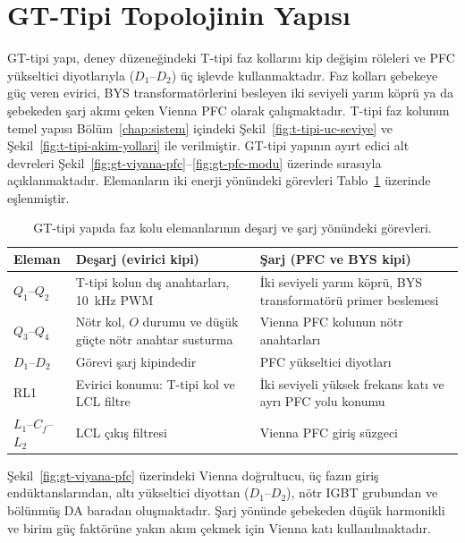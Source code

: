 \section{GT-Tipi Topolojinin Yapısı}
\label{sec:gt-yapi}

GT-tipi yapı, deney düzeneğindeki T-tipi faz kollarını kip değişim röleleri ve PFC yükseltici diyotlarıyla ($D_1$--$D_2$) üç işlevde kullanmaktadır. Faz kolları şebekeye güç veren evirici, BYS transformatörlerini besleyen iki seviyeli yarım köprü ya da şebekeden şarj akımı çeken Vienna PFC olarak çalışmaktadır. T-tipi faz kolunun temel yapısı Bölüm~\ref{chap:sistem} içindeki Şekil~\ref{fig:t-tipi-uc-seviye} ve Şekil~\ref{fig:t-tipi-akim-yollari} ile verilmiştir. GT-tipi yapının ayırt edici alt devreleri Şekil~\ref{fig:gt-viyana-pfc}--\ref{fig:gt-pfc-modu} üzerinde sırasıyla açıklanmaktadır. Elemanların iki enerji yönündeki görevleri Tablo~\ref{tab:gt-eleman-gorevleri} üzerinde eşlenmiştir.

\begin{table}[H]
  \centering
  \caption{GT-tipi yapıda faz kolu elemanlarının deşarj ve şarj yönündeki görevleri.}
  \label{tab:gt-eleman-gorevleri}
  \small
  \begin{tabularx}{\textwidth}{@{}>{\raggedright\arraybackslash}p{}>{\raggedright\arraybackslash}X>{\raggedright\arraybackslash}X@{}}
    \toprule
    Eleman & Deşarj (evirici kipi) & Şarj (PFC ve BYS kipi) \\
    \midrule
    $Q_1$--$Q_2$ & T-tipi kolun dış anahtarları, \SI{10}{\kilo\hertz} PWM & İki seviyeli yarım köprü, BYS transformatörü primer beslemesi \\
    $Q_3$--$Q_4$ & Nötr kol, $O$ durumu ve düşük güçte nötr anahtar susturma & Vienna PFC kolunun nötr anahtarları \\
    $D_1$--$D_2$ & Görevi şarj kipindedir & PFC yükseltici diyotları \\
    RL1 & Evirici konumu: T-tipi kol ve LCL filtre & İki seviyeli yüksek frekans katı ve ayrı PFC yolu konumu \\
    $L_1$--$C_f$--$L_2$ & LCL çıkış filtresi & Vienna PFC giriş süzgeci \\
    \bottomrule
  \end{tabularx}
\end{table}

Şekil~\ref{fig:gt-viyana-pfc} üzerindeki Vienna doğrultucu, üç fazın giriş endüktanslarından, altı yükseltici diyottan ($D_1$--$D_2$), nötr IGBT grubundan ve bölünmüş DA baradan oluşmaktadır. Şarj yönünde şebekeden düşük harmonikli ve birim güç faktörüne yakın akım çekmek için Vienna katı kullanılmaktadır.

